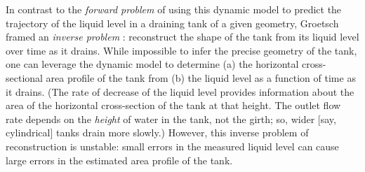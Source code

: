 \documentclass[a4paper,fleqn]{cas-dc}
\begin{document}
In contrast to the \emph{forward problem} of using this dynamic model to predict the trajectory of the liquid level in a draining tank of a given geometry, Groetsch \cite{groetsch1993inverse_tl,groetsch1999inverse} framed an \emph{inverse problem} \cite{groetsch1993inverse,neto2012introduction,tarantola2005inverse}: reconstruct the shape of the tank from its liquid level over time as it drains. 
While impossible to infer the precise geometry of the tank, one can leverage the dynamic model to determine
(a) the horizontal cross-sectional area profile of the tank from (b) the liquid level as a function of time as it drains. (The rate of decrease of the liquid level provides information about the area of the horizontal cross-section of the tank at that height. The outlet flow rate depends on the \emph{height} of water in the tank, not the girth; so, wider [say, cylindrical] tanks drain more slowly.)
However, this inverse problem of reconstruction is unstable: small errors in the measured liquid level can cause large errors in the estimated area profile of the tank. \cite{groetsch1993inverse_tl}
\end{document}
